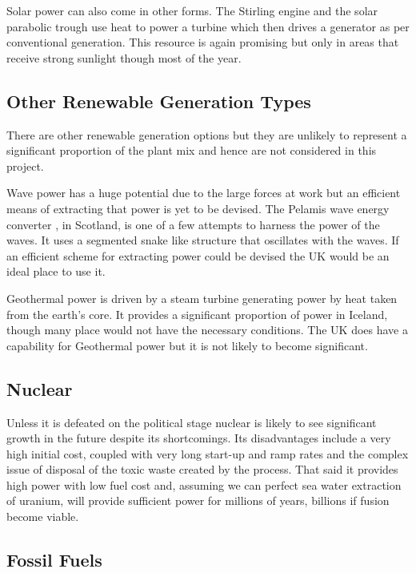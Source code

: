\documentclass[a4paper,oneside,12pt]{report}
\begin{document}
Solar power can also come in other forms. The Stirling engine and the solar parabolic trough use heat to power a turbine which then drives a generator as per conventional generation. This resource is again promising but only in areas that receive strong sunlight though most of the year.

\subsection{Other Renewable Generation Types}

There are other renewable generation options but they are unlikely to represent a significant proportion of the plant mix and hence are not considered in this project.

Wave power has a huge potential due to the large forces at work but an efficient means of extracting that power is yet to be devised. The Pelamis wave energy converter \cite{Holzman2007}, in Scotland, is one of a few attempts to harness the power of the waves. It uses a segmented snake like structure that oscillates with the waves. If an efficient scheme for extracting power could be devised the UK would be an ideal place to use it.

Geothermal power is driven by a steam turbine generating power by heat taken from the earth's core. It provides a significant proportion of power in Iceland, though many place would not have the necessary conditions. The UK does have a capability for Geothermal power but it is not likely to become significant.

\subsection{Nuclear}

Unless it is defeated on the political stage nuclear is likely to see significant growth in the future despite its shortcomings. Its disadvantages include a very high initial cost, coupled with very long start-up and ramp rates and the complex issue of disposal of the toxic waste created by the process. That said it provides high power with low fuel cost and, assuming we can perfect sea water extraction of uranium, will provide sufficient power for millions of years, billions if fusion become viable.

\subsection{Fossil Fuels}
\end{document}
